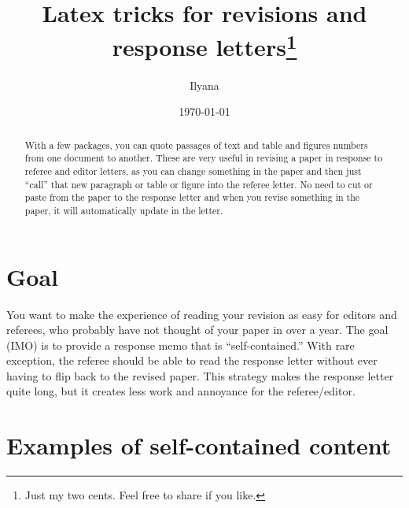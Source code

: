 \documentclass[12pt,pdftex, notitlepage]{article}
\begin{document}
\author{Ilyana}
\title{\vspace{-2.5cm}\Large{Latex tricks for revisions and response letters}\thanks{Just my two cents.  Feel free to share if you like.}
}
\date{\today}

\maketitle
\begin{abstract}
\noindent
With a few packages, you can quote passages of text and table and figures numbers from one document to another.  These are very useful in revising a paper in response to referee and editor letters, as you can change something in the paper and then just ``call'' that new paragraph or table or figure into the referee letter.  No need to cut or paste from the paper to the response letter and when you revise something in the paper, it will automatically update in the letter.
\end{abstract}

\medskip
\noindent

\noindent

\thispagestyle{empty}

\newpage

\onehalfspacing
\setcounter{page}{1}


\section{Goal}

You want to make the experience of reading your revision as easy for editors and referees, who probably have not thought of your paper in over a year.  The goal (IMO) is to provide a response memo that is ``self-contained.''  With rare exception, the referee should be able to read the response letter without ever having to flip back to the revised paper.  This strategy makes the response letter quite long, but it creates less work and annoyance for the referee/editor.  

\section{Examples of self-contained content}
\end{document}
